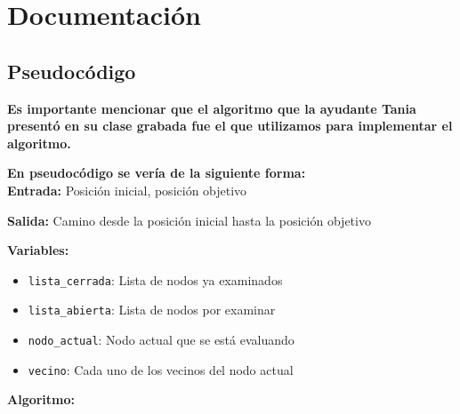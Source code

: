 \section{Documentación}

\subsection*{Pseudocódigo}

\textbf{Es importante mencionar que el algoritmo que la ayudante Tania presentó en su clase grabada fue el que utilizamos para implementar el algoritmo.}

\textbf{En pseudocódigo se vería de la siguiente forma:}
\\
\textbf{Entrada:} Posición inicial, posición objetivo

\textbf{Salida:} Camino desde la posición inicial hasta la posición objetivo

\textbf{Variables:}

\begin{itemize}
    \item \texttt{lista\_cerrada}: Lista de nodos ya examinados
    \item \texttt{lista\_abierta}: Lista de nodos por examinar
    \item \texttt{nodo\_actual}: Nodo actual que se está evaluando
    \item \texttt{vecino}: Cada uno de los vecinos del nodo actual
\end{itemize}

\textbf{Algoritmo:}

